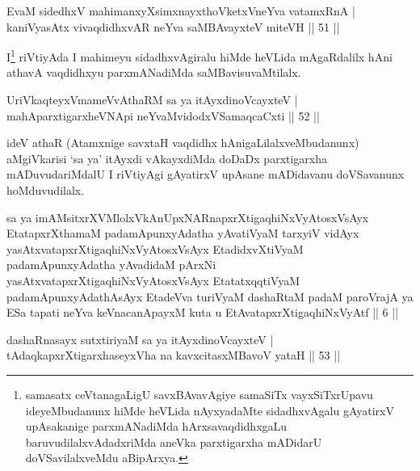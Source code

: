 \begin{shl}
EvaM sidedhxV mahimanxyXsimxnayxthoVketxVneYva vatamxRnA | \\
kaniVyasAtx vivaqdidhxvAR neYva saMBAvayxteV miteVH \hfill ||  51 || 
\end{shl}

\begin{artha} 
I\footnote{samasatx ceVtanagaLigU savxBAvavAgiye samaSiTx 
vayxSiTxrUpavu ideyeMbudanunx hiMde heVLida nAyxyadaMte sidadhxvAgalu 
gAyatirxV upAsakanige parxmANadiMda hArxsavaqdidhxgaLu 
baruvudilalxvAdadxriMda aneVka parxtigarxha mADidarU doVSavilalxveMdu 
aBipArxya.} riVtiyAda I mahimeyu sidadhxvAgiralu hiMde heVLida 
mAgaRdalilx hAni athavA vaqdidhxyu parxmANadiMda saMBavisuvaMtilalx.
\end{artha}


\begin{shl}
UriVkaqteyxVmameVvAthaRM sa ya itAyxdinoVcayxteV | \\
mahAparxtigarxheVNApi neYvaMvidodxVSamaqcaCxti \hfill ||  52 || 
\end{shl}

\begin{artha} 
ideV athaR (Atamxnige savxtaH vaqdidhx hAnigaLilalxveMbudanunx)\break 
aMgiVkarisi `sa ya' itAyxdi vAkayxdiMda doDaDx parxtigarxha 
mADuvudariMdalU I riVtiyAgi gAyatirxV upAsane mADidavanu doVSavanunx 
hoMduvudilalx. 
\end{artha}

\begin{kandikeshl}
sa ya imAMsitxrXVMlolxVkAnUpxNARnapxrXtigaqhiNxVyAtosxV\s sAyx EtatapxrXthamaM padamApunxyAdatha yAvatiVyaM tarxyiV vidAyx yasAtxvatapxrXtigaqhiNxVyAtosxV\s sAyx EtadidxvXtiVyaM padamApunxyAdatha yAvadidaM pArxNi yasAtxvatapxrXtigaqhiNxVyAtosxV\s sAyx EtatatxqqtiVyaM padamApunxyAdathAsAyx EtadeVva turiVyaM dashaRtaM padaM paroVrajA ya ESa tapati neYva keVnacanApayxM kuta u EtAvatapxrXtigaqhiNxVyAtf || 6 ||
\end{kandikeshl}

\begin{shl}
dashaRnasayx sutxtiriyaM sa ya itAyxdinoVcayxteV | \\
tAdaqkapxrXtigarxhaseyxVha na kavxcitasxMBavoV yataH \hfill ||  53 || 
\end{shl}

